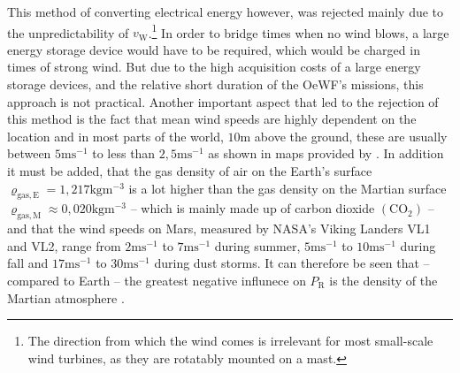 This method of converting electrical energy however, was rejected mainly due to the unpredictability of $v_{\mathrm W}$.\footnote{The direction from which the wind comes is irrelevant for most small-scale wind turbines, as they are rotatably mounted on a mast.} In order to bridge times when no wind blows, a large energy storage device would have to be required, which would be charged in times of strong wind. But due to the high acquisition costs of a large energy storage devices, and the relative short duration of the OeWF's missions, this approach is not practical. Another important aspect that led to the rejection of this method is the fact that mean wind speeds are highly dependent on the location and in most parts of the world, $10 \mathrm m$ above the ground, these are usually between $5 \mathrm m \mathrm s^{-1}$ to less than $2,5 \mathrm m \mathrm s^{-1}$ as shown in maps provided by \cite{Atlas:2020}. In addition it must be added, that the gas density of air on the Earth's surface $\varrho_{\mathrm {gas,E}} = 1,217 \mathrm{kg} \mathrm{m}^{-3}$ is a lot higher than the gas density on the Martian surface $\varrho_{\mathrm {gas,M}} \approx 0,020 \mathrm{kg}  \mathrm{m}^{-3}$ -- which is mainly made up of carbon dioxide $\left( \mathrm{CO}_2 \right)$ -- and that the wind speeds on Mars, measured by NASA's Viking Landers VL1 and VL2, range from $2 \mathrm m  \mathrm s^{-1}$ to $7 \mathrm m \mathrm s^{-1}$ during summer, $5 \mathrm m \mathrm s^{-1}$ to $10 \mathrm m \mathrm s^{-1}$ during fall and $17\mathrm m \mathrm s^{-1}$ to $30 \mathrm m  \mathrm s^{-1}$ during dust storms. It can therefore be seen that -- compared to Earth -- the greatest negative influnece on $P_{\mathrm R}$ is the density of the Martian atmosphere \cite{Grayzeck:2020, Williams:2020}.
